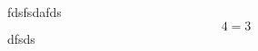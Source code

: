 \documentclass{standalone}
\begin{document}
    fdsfsdafds
    \[ 4 = 3 \]
    dfsds
\end{document}
